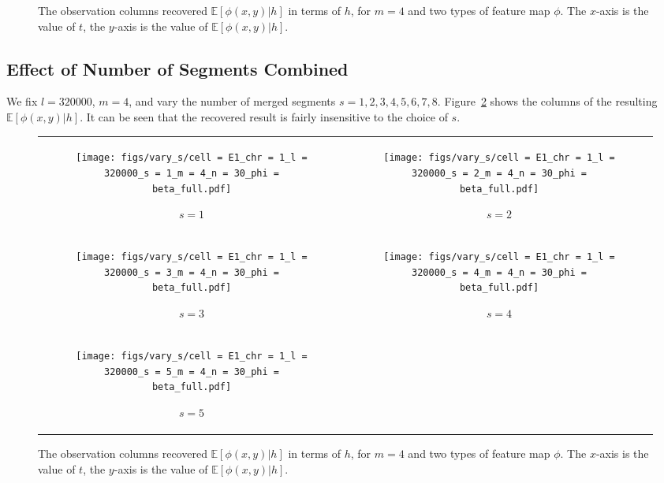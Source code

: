 \documentclass{article}
\def\E{\mathbb{E}}
\begin{document}
{\begin{figure}[H]
    \caption{The observation columns recovered $\E[\phi(x,y)|h]$ in terms of $h$, for $m = 4$ and two types of feature map $\phi$. The $x$-axis is the value of $t$, the $y$-axis is the value of $\E[\phi(x,y)|h]$.}
    \label{fig:varyphi}
\end{figure}

\subsection{Effect of Number of Segments Combined}
We fix $l = 320000$, $m = 4$, and vary the number of merged segments $s = 1,2,3,4,5,6,7,8$. Figure~\ref{fig:varys} shows the columns of the resulting $\E[\phi(x,y)|h]$. It can be seen that the recovered result is fairly insensitive to the choice of $s$.

\begin{figure}[H]
    \begin{tabular}{cc}
    \begin{subfigure}[t]{0.45\textwidth}
        \texttt{[image: figs/vary\_s/cell = E1\_chr = 1\_l = 320000\_s = 1\_m = 4\_n = 30\_phi = beta\_full.pdf]}
        \caption{$s = 1$}
    \end{subfigure}
    &
    \begin{subfigure}[t]{0.45\textwidth}
        \texttt{[image: figs/vary\_s/cell = E1\_chr = 1\_l = 320000\_s = 2\_m = 4\_n = 30\_phi = beta\_full.pdf]}
        \caption{$s = 2$}
    \end{subfigure}
    \\
    \begin{subfigure}[t]{0.45\textwidth}
        \texttt{[image: figs/vary\_s/cell = E1\_chr = 1\_l = 320000\_s = 3\_m = 4\_n = 30\_phi = beta\_full.pdf]}
        \caption{$s = 3$}
    \end{subfigure}
    &
    \begin{subfigure}[t]{0.45\textwidth}
        \texttt{[image: figs/vary\_s/cell = E1\_chr = 1\_l = 320000\_s = 4\_m = 4\_n = 30\_phi = beta\_full.pdf]}
        \caption{$s = 4$}
    \end{subfigure}
    \\
    \begin{subfigure}[t]{0.45\textwidth}
        \texttt{[image: figs/vary\_s/cell = E1\_chr = 1\_l = 320000\_s = 5\_m = 4\_n = 30\_phi = beta\_full.pdf]}
        \caption{$s = 5$}
    \end{subfigure}
    \end{tabular}

    \caption{The observation columns recovered $\E[\phi(x,y)|h]$ in terms of $h$, for $m = 4$ and two types of feature map $\phi$. The $x$-axis is the value of $t$, the $y$-axis is the value of $\E[\phi(x,y)|h]$.}
    \label{fig:varys}
\end{figure}
}
\end{document}
